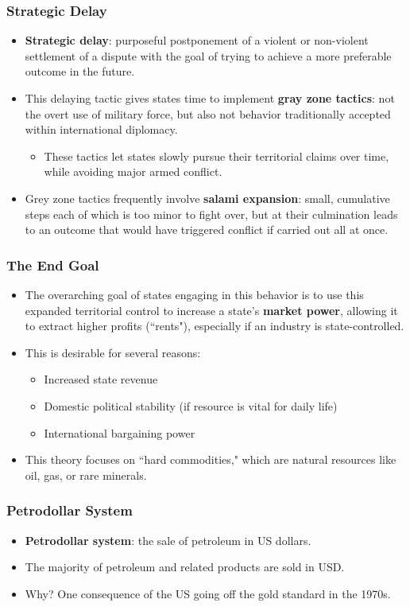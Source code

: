 \documentclass[handout]{beamer}
\begin{document}
\begin{frame} 
	\frametitle{\LARGE{Strategic Delay}}
	\begin{itemize}
		\item \textbf{Strategic delay}: purposeful postponement of a violent or non-violent settlement of a dispute  with the goal of trying to achieve a more preferable outcome in the future. \pause
		\item This delaying tactic gives states time to implement \textbf{gray zone tactics}: not the overt use of military force, but also not behavior traditionally accepted within international diplomacy. \pause
		\begin{itemize}
			\item These tactics let states slowly pursue their territorial claims over time, while avoiding major armed conflict. \pause
		\end{itemize}	
		\item Grey zone tactics frequently involve \textbf{salami expansion}: small, cumulative steps each of which is too minor to fight over, but at their culmination leads to an outcome that would have triggered conflict if carried out all at once. 
	\end{itemize}
\end{frame}

\begin{frame} 
	\frametitle{\LARGE{The End Goal}}
	\begin{itemize}
		\item The overarching goal of states engaging in this behavior is to use this expanded territorial control to increase a state's \textbf{market power}, allowing it to extract higher profits (``rents"), especially if an industry is state-controlled. \pause
		\item This is desirable for several reasons:
		\begin{itemize}
			\item Increased state revenue
			\item Domestic political stability (if resource is vital for daily life)
			\item International bargaining power
		\end{itemize}
		\item This theory focuses on ``hard commodities," which are natural resources like oil, gas, or rare minerals.	
	\end{itemize}
\end{frame}

\begin{frame} 
	\frametitle{\LARGE{Petrodollar System}}
	\begin{itemize}
		\item \textbf{Petrodollar system}: the sale of petroleum in US dollars. \pause
		\item The majority of petroleum and related products are sold in USD. \pause
		\item Why? One consequence of the US going off the gold standard in the 1970s. 
	\end{itemize}
\end{frame}
\end{document}
